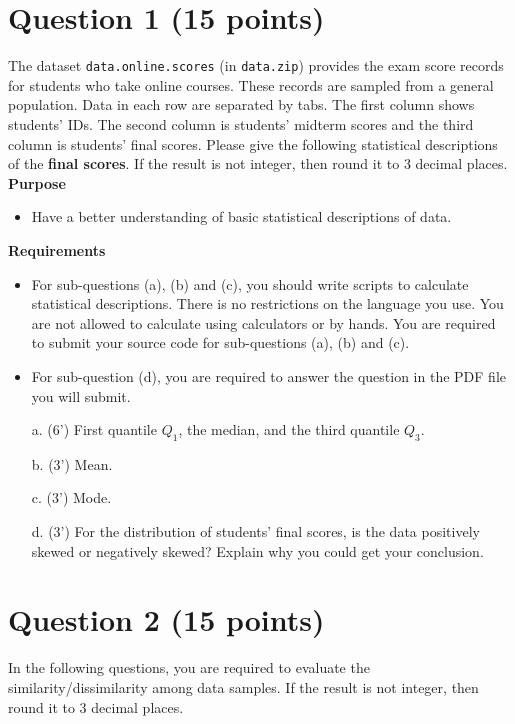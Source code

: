\section*{Question 1 (15 points)}
The dataset \texttt{data.online.scores} (in \texttt{data.zip}) provides the exam score records  for students who take online courses. These records are sampled from a general population. Data in each row are separated by tabs. The first column shows students' IDs. The second column is students' midterm scores and the third column is students' final scores.  Please give the following statistical descriptions of the \textbf{final scores}. If the result is not integer, then round it to 3 decimal places.\\

\textbf{Purpose} 
\begin{itemize}
\item Have a better understanding of basic statistical descriptions of data.
\end{itemize}

\textbf{Requirements} 
\begin{itemize}
\item For sub-questions (a), (b) and (c), you should write scripts to calculate statistical descriptions. There is no restrictions on the language you use. You are not allowed to calculate using calculators or by hands. You are required to submit your source code for sub-questions (a), (b) and (c).
\item For sub-question (d), you are required to answer the question in the PDF file you will submit.
\end{itemize}
\begin{itemize}
 \item[a.] (6') First quantile $Q_1$, the median, and the third quantile $Q_3$.
 \item[b.] (3') Mean.
 \item[c.] (3') Mode.
 \item[d.] (3') For the distribution of students' final scores, is the data positively skewed or negatively skewed? Explain why you could get your conclusion.
 \end{itemize}
 

\section*{Question 2 (15 points)}

In the following questions, you are required to evaluate the similarity/dissimilarity among data samples. If the result is not integer, then round it to 3 decimal places.\\


